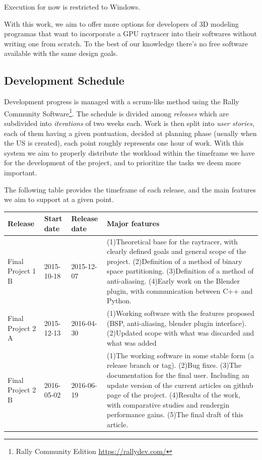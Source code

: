 \documentclass[a4paper]{sbgames}               %
\begin{document}
Execution for now is restricted to Windows.

With this work, we aim to offer more options for developers of 3D
modeling programas that want to incorporate a GPU raytracer into their
softwares without writing one from scratch. To the best of our
knowledge there's no free software available with the same design
goals.

\subsection{Development Schedule}

Development progress is managed with a scrum-like method using the
Rally Community Software\footnote{Rally Community Edition
 \url{https://rallydev.com/}}. The schedule is divided among
\emph{releases} which are subdivided into \emph{iterations} of two
weeks each. Work is then split into \emph{user stories}, each of them
having a given pontuation, decided at planning phase (usually when the
US is created), each point roughly represents one hour of work. With
this system we aim to properly distribute the workload within the
timeframe we have for the development of the project, and to
prioritize the tasks we deem more important.

The following table provides the timeframe of each release, and the
main features we aim to support at a given point.

\begin{tabular}{ | p{.8cm} | p{1cm} | p{1cm} | p{4cm} |}
  \hline
  Release & Start date & Release date & Major features \\ \hline
  Final Project 1 B & 2015-10-18 & 2015-12-07 & (1)Theoretical base for the raytracer, with clearly defined goals and
                                                general scope of the project. (2)Definition of a method of binary
                                                space partitioning. (3)Definition of a method of anti-aliasing.
                                                (4)Early work on the Blender plugin, with communication between C++ and Python. \\ \hline
  Final Project 2 A & 2015-12-13 & 2016-04-30 & (1)Working software with the features proposed (BSP, anti-aliasing, blender plugin interface).
                                                (2)Updated scope with what was discarded and what was added \\ \hline
  Final Project 2 B & 2016-05-02 & 2016-06-19 & (1)The working software in some stable form (a release branch or tag). (2)Bug fixes.
                                                (3)The documentation for the final user. Including an update version of
                                                the current articles on github page of the project. (4)Results of the work,
                                                with comparative studies and rendergin performance gains.
                                                (5)The final draft of this article. \\ \hline
\end{tabular}





\end{document}
